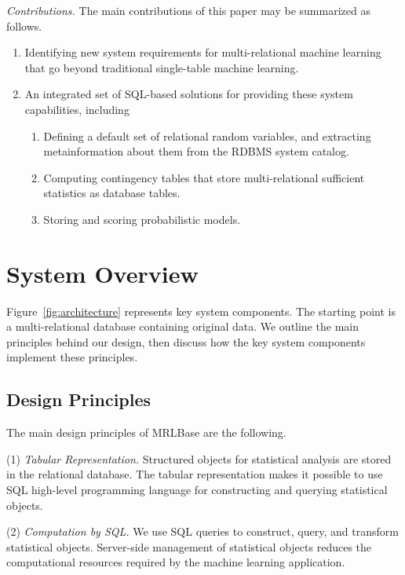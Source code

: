 \documentclass{acm_proc_article-sp}
\begin{document}
{\em Contributions.} The main contributions of this paper may be summarized as follows.
\begin{enumerate}
\item Identifying new system requirements for multi-relational machine learning that go beyond traditional single-table machine learning.
\item An integrated set of SQL-based solutions for providing these system capabilities, including 
\begin{enumerate}
\item Defining a default set of relational random variables, and extracting metainformation about them from the RDBMS system catalog.
\item Computing contingency tables that store multi-relational sufficient statistics as database tables.
\item Storing and scoring probabilistic models.
\end{enumerate}

\end{enumerate}



\section{System Overview} 

Figure~\ref{fig:architecture} represents key system components. The starting point is a multi-relational database containing original data. 
We outline the main principles behind our design, then discuss how the key system components implement these principles.

\subsection{Design Principles} \label{sec:design} The main design principles of MRLBase are the following. 

(1) {\em Tabular Representation.} Structured objects for statistical analysis are stored in the relational database. 
 The tabular representation makes it possible to use SQL high-level programming language for constructing and querying statistical objects.

(2) {\em Computation by SQL.} We use SQL queries to construct, query, and transform statistical objects. Server-side management of statistical objects reduces the computational resources required by the machine learning application.
\end{document}
